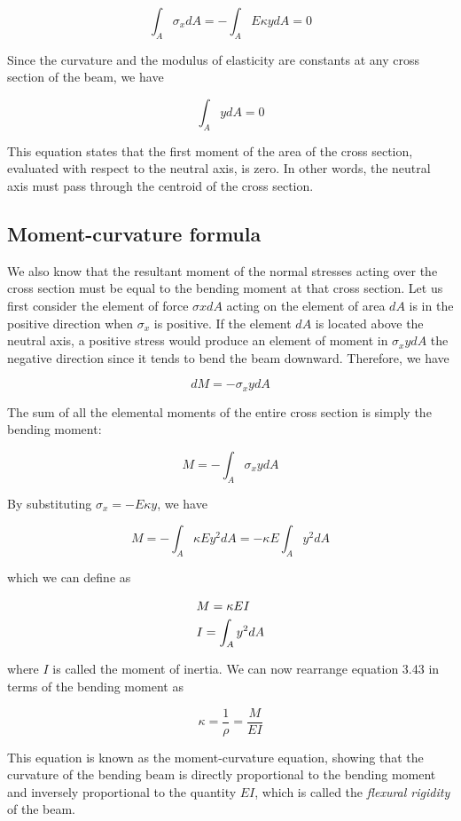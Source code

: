 \documentclass[a4paper,openany,12pt]{book}
\begin{document}
$$\int_A\sigma_x dA  =  - \int_A E\kappa ydA  = 0$$

Since the curvature and the modulus of elasticity are constants at any
cross section of the beam, we have

$$\int_A ydA = 0$$

This equation states that the first moment of the area of the cross
section, evaluated with respect to the neutral axis, is zero. In other
words, the neutral axis must pass through the centroid of the cross
section.

\subsection{Moment-curvature formula}
\label{moment-curvature-formula}
We also know that the resultant moment of the normal stresses acting
over the cross section must be equal to the bending moment at that cross
section. Let us first consider the element of force \(\sigma xdA\) acting
on the element of area \(dA\) is in the positive direction when \(\sigma_x\)
is positive. If the element \(dA\) is located above the neutral axis, a
positive stress would produce an element of moment in \(\sigma_xydA\) the
negative direction since it tends to bend the beam downward. Therefore,
we have


$$dM =  - \sigma _xydA$$

The sum of all the elemental moments of the entire cross section is
simply the bending moment:

$$M =  - \int_A \sigma_xydA$$

By substituting \(\sigma_x = -E\kappa y\), we have

$$M =  - \int_A \kappa Ey^2dA  =  - \kappa E\int_A y^2dA$$

which we can define as

$$\begin{gathered}
  M = \kappa EI \hfill \\
  I = \int_A y^2dA  \hfill \\ 
\end{gathered}$$

where \(I\) is called the moment of inertia. We can now rearrange equation
3.43 in terms of the bending moment as

$$ \kappa  = \frac{1}{\rho } = \frac{M}{EI}$$

This equation is known as the moment-curvature equation, showing that
the curvature of the bending beam is directly proportional to the
bending moment and inversely proportional to the quantity \(EI\), which is
called the \emph{flexural rigidity} of the beam.
\end{document}
